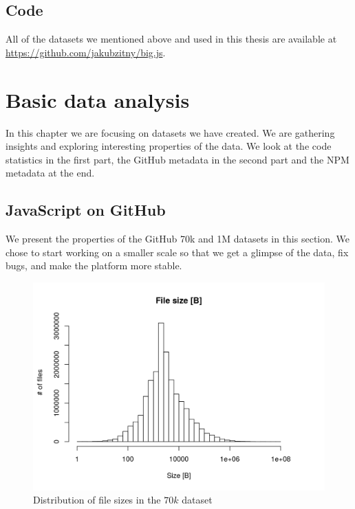 \documentclass[thesis=M,english]{FITthesis}[2012/10/20]
\begin{document}
\section{Code}

All of the datasets we mentioned above and used in this thesis are available at \url{https://github.com/jakubzitny/big.js}. 

\chapter{Basic data analysis}

In this chapter we are focusing on datasets we have created. We are gathering insights and exploring interesting properties of the data. We look at the code statistics in the first part, the GitHub metadata in the second part and the NPM metadata at the end.

\section{JavaScript on GitHub}

We present the properties of the GitHub 70k and 1M datasets in this section. We chose to start working on a smaller scale so that we get a glimpse of the data, fix bugs, and make the platform more stable. \\

\begin{center}
\begin{figure}[h!]
	\includegraphics[trim=0cm 0cm 2cm 0cm, totalheight=230pt]{images/70k_bytes.png}
	\caption{Distribution of file sizes in the $70k$ dataset}
	\label{fig: 70k_bytes}
\end{figure}
\end{center}
\end{document}
